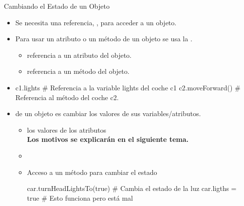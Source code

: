 \documentclass[10pt,envcountsect,spanish]{beamer}
\begin{document}






\begin{frame}[fragile]{Cambiando el Estado de un Objeto} 

\begin{itemize}
\item Se necesita una referencia, , para acceder a un objeto.

\item Para usar un atributo o  un método de un objeto se usa la .

	\begin{itemize}
	\item {} \qquad referencia a un atributo del objeto.
	\item {} \qquad referencia a un método del objeto.
	\end{itemize}
	
	
\item[] \unEjemplo 
{\small 
\begin{pyverbatim}[][frame=single]
c1.lights         # Referencia a la variable lights del coche c1
c2.moveForward()  # Referencia al método del coche c2.
\end{pyverbatim}
}

\item {} de un objeto es cambiar los valores de sus variables/atributos.
\begin{itemize}
\item {} los valores de los atributos \\
\hfil \textbf{Los motivos se explicarán en el siguiente tema.}
	
\item {}

\item[] \unEjemplo \textsf{Acceso a un método para cambiar el estado}

\begin{pyverbatim}[][frame=single]
car.turnHeadLightsTo(true) # Cambia el estado de la luz
car.ligths = true          # Esto funciona pero está mal
\end{pyverbatim}

\end{itemize}
\end{itemize}
\end{frame}
\end{document}
